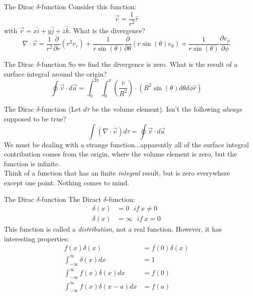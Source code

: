 \documentclass{beamer}
\begin{document}
\begin{frame}{The Dirac $\delta$-function}
Consider this function:
\begin{equation}
\vec{v} = \frac{1}{r^2}\hat{r}
\end{equation}
with $\vec{r} = x\hat{i} + y\hat{j} + z\hat{k}$.  What is the divergence?
\begin{equation}
\nabla \cdot \vec{v} = \frac{1}{r^2}\frac{\partial}{\partial r}(r^2 v_r) + \frac{1}{r\sin(\theta)}\frac{\partial}{\partial \theta}(r\sin(\theta) v_\theta) + \frac{1}{r\sin(\theta)} \frac{\partial v_\phi}{\partial \phi}
\end{equation}
\end{frame}

\begin{frame}{The Dirac $\delta$-function}
So we find the divergence is zero.  What is the result of a surface integral around the origin?
\begin{equation}
\oint \vec{v} \cdot d \vec{a} = \int_0^{2\pi} \int_0^{\pi} \left(\frac{\hat{r}}{R^2}\right) \cdot (R^2 \sin(\theta) d\theta d\phi \hat{r})
\end{equation}
\end{frame}

\begin{frame}{The Dirac $\delta$-function}
(Let $d\tau$ be the volume element).  Isn't the following \textit{always} supposed to be true?
\begin{equation}
\int (\nabla \cdot \vec{v}) d\tau = \oint \vec{v} \cdot d \vec{a}
\end{equation}
We must be dealing with a strange function...apparently all of the surface integral contribution comes from the origin, where the volume element is zero, but the function is infinite. \\ \vspace{0.2cm}
Think of a function that has an finite \textit{integral} result, but is zero everywhere except one point.  Nothing comes to mind.
\end{frame}

\begin{frame}{The Dirac $\delta$-function}
The Diract $\delta$-function:
\begin{align}
\delta(x) &= 0 ~~~ if~x\neq 0 \\
\delta(x) &= \infty ~~~ if~x = 0
\end{align}
This function is called a \textit{distribution}, not a real function.  However, it has interesting properties:
\begin{align}
f(x) \delta(x) &= f(0) \delta(x) \\
\int_{-\infty}^{\infty} \delta(x) dx &= 1 \\
\int_{-\infty}^{\infty} f(x) \delta(x) dx &= f(0) \\
\int_{-\infty}^{\infty} f(x) \delta(x-a) dx &= f(a)
\end{align}
\end{frame}
\end{document}
